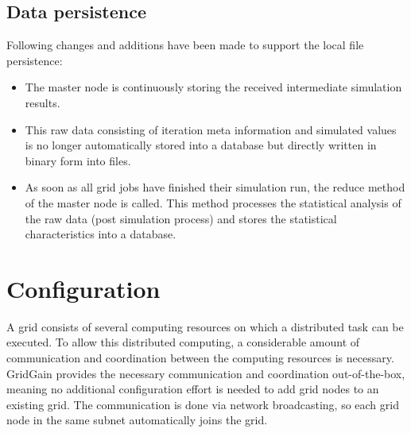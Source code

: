 \subsection{Data persistence}
\label{sec:devguide-data}
Following changes and additions have been made to support the local file persistence:
\begin{itemize}
 \item The master node is continuously storing the received intermediate simulation results.
 \item This raw data consisting of iteration meta information and simulated values is no longer automatically stored into a database
but directly written in binary form into files.
 \item As soon as all grid jobs have finished their simulation run, the reduce method of the master node is called. This method
processes the statistical analysis of the raw data (post simulation process) and stores the statistical characteristics into a database.
\end{itemize}

\section{Configuration}
A grid consists of several computing resources on which a distributed task can be executed. To allow this distributed
computing, a considerable amount of communication and coordination between the computing resources is necessary.
GridGain provides the necessary communication and coordination out-of-the-box, meaning no additional configuration effort
is needed to add grid nodes to an existing grid. The communication is done via network broadcasting, so each grid node
in the same subnet automatically joins the grid.


